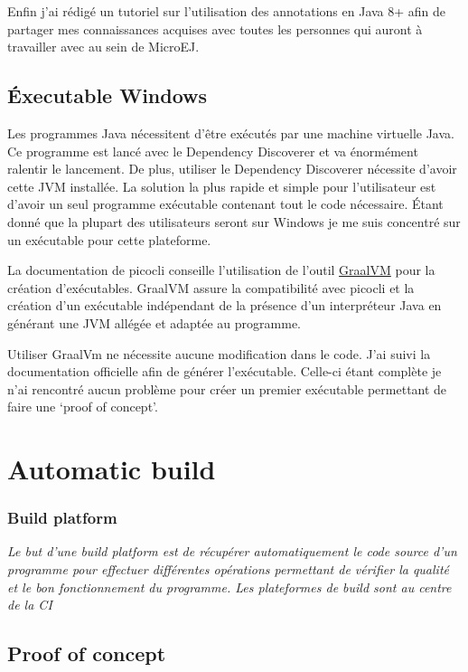 \documentclass[french,a4paper,12pt]{report}
\begin{document}
Enfin j'ai rédigé un tutoriel sur l'utilisation des annotations en Java 8+ afin de partager mes connaissances acquises avec toutes les personnes qui auront à travailler avec au sein de MicroEJ.

\subsection{Éxecutable Windows}

Les programmes Java nécessitent d’être exécutés par une machine virtuelle Java. Ce programme est lancé avec le Dependency Discoverer et va énormément ralentir le lancement. De plus, utiliser le Dependency Discoverer nécessite d’avoir cette JVM installée. La solution la plus rapide et simple pour l’utilisateur est d’avoir un seul programme exécutable contenant tout le code nécessaire. Étant donné que la plupart des utilisateurs seront sur Windows je me suis concentré sur un exécutable pour cette plateforme.

La documentation de picocli conseille l’utilisation de l’outil \href{https://www.graalvm.org/}{GraalVM} pour la création d’exécutables. GraalVM assure la compatibilité avec picocli et la création d’un exécutable indépendant de la présence d'un interpréteur Java en générant une JVM allégée et adaptée au programme. 

Utiliser GraalVm ne nécessite aucune modification dans le code. J’ai suivi la documentation officielle afin de générer l’exécutable. Celle-ci étant complète je n’ai rencontré aucun problème pour créer un premier exécutable permettant de faire une ‘proof of concept’.


\section{Automatic build}

\subsubsection{Build platform}

\textit{Le but d’une build platform est de récupérer automatiquement le code source d’un programme pour effectuer différentes opérations permettant de vérifier la qualité et le bon fonctionnement du programme. Les plateformes de build sont au centre de la CI}

\subsection{Proof of concept}
\end{document}
